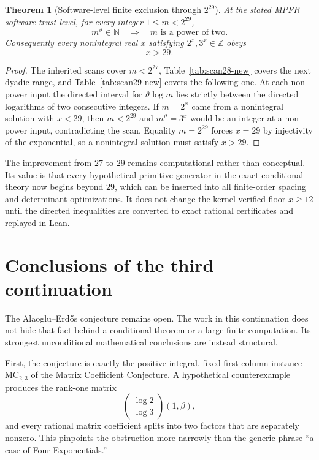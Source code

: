 \documentclass[11pt,oneside]{article}
\newtheorem{theorem}{Theorem}[section]
\theoremstyle{definition}
\theoremstyle{remark}
\newcommand{\N}{\mathbb N}
\newcommand{\Z}{\mathbb Z}
\begin{document}
\begin{theorem}[Software-level finite exclusion through $2^{29}$]
\label{thm:finite29}
At the stated MPFR software-trust level, for every integer $1\le m<2^{29}$,
\[
 m^{\vartheta}\in\N
 \quad\Longrightarrow\quad
 m\text{ is a power of two}.
\]
Consequently every nonintegral real $x$ satisfying $2^x,3^x\in\Z$ obeys
\begin{equation}
 x>29.
 \label{eq:x-gt-29}
\end{equation}
\end{theorem}

\begin{proof}
The inherited scans cover $m<2^{27}$, Table~\ref{tab:scan28-new} covers the next dyadic range,
and Table~\ref{tab:scan29-new} covers the following one.  At each non-power input the directed
interval for $\vartheta\log m$ lies strictly between the directed logarithms of two consecutive
integers.  If $m=2^x$ came from a nonintegral solution with $x<29$, then
$m<2^{29}$ and $m^\vartheta=3^x$ would be an integer at a non-power input, contradicting the
scan.  Equality $m=2^{29}$ forces $x=29$ by injectivity of the exponential, so a nonintegral
solution must satisfy $x>29$.
\end{proof}

The improvement from $27$ to $29$ remains computational rather than conceptual.  Its value is
that every hypothetical primitive generator in the exact conditional theory now begins beyond
$29$, which can be inserted into all finite-order spacing and determinant optimizations.  It
does not change the kernel-verified floor $x\ge12$ until the directed inequalities are converted
to exact rational certificates and replayed in Lean.


\section{Conclusions of the third continuation}
\label{sec:third-conclusion}

The Alaoglu--Erd\H{o}s conjecture remains open.  The work in this continuation does not hide
that fact behind a conditional theorem or a large finite computation.  Its strongest
unconditional mathematical conclusions are instead structural.

First, the conjecture is exactly the positive-integral, fixed-first-column instance
$\mathrm{MC}_{2,3}$ of the Matrix Coefficient Conjecture.  A hypothetical counterexample
produces the rank-one matrix
\[
 \begin{pmatrix}\log2\\\log3\end{pmatrix}(1,\beta),
\]
and every rational matrix coefficient splits into two factors that are separately nonzero.
This pinpoints the obstruction more narrowly than the generic phrase ``a case of Four
Exponentials.''
\end{document}
